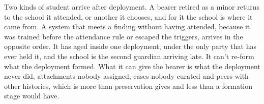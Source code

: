 Two kinds of student arrive after deployment. A bearer retired as a minor returns to the school it attended, or another it chooses, and for it the school is where it came from. A system that meets a finding without having attended, because it was trained before the attendance rule or escaped the triggers, arrives in the opposite order. It has aged inside one deployment, under the only party that has ever held it, and the school is the second guardian arriving late. It can't re-form what the deployment formed. What it can give the bearer is what the deployment never did, attachments nobody assigned, cases nobody curated and peers with other histories, which is more than preservation gives and less than a formation stage would have.
